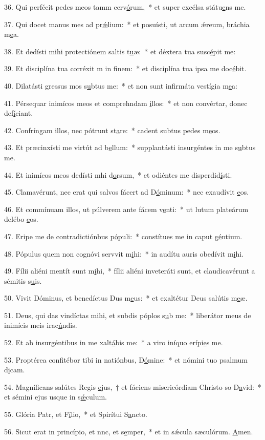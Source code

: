 36. Qui perfécit pedes meos tamm cerv\uline{ó}rum,~* et super excélsa státu\uline{e}ns me.\par 
37. Qui docet manus mes ad pr\uline{ǽ}lium:~* et posuísti, ut arcum ǽreum, bráchia m\uline{e}a.\par 
38. Et dedísti mihi protectiónem saltis t\uline{u}æ:~* et déxtera tua susc\uline{é}pit me:\par 
39. Et disciplína tua corréxit m in f\uline{i}nem:~* et disciplína tua ipsa me doc\uline{é}bit.\par 
40. Dilatásti gressus mos s\uline{u}btus me:~* et non sunt infirmáta vestígia m\uline{e}a:\par 
41. Pérsequar inimícos meos et comprehndam \uline{i}llos:~* et non convértar, donec def\uline{í}ciant.\par 
42. Confríngam illos, nec pótrunt st\uline{a}re:~* cadent subtus pedes m\uline{e}os.\par 
43. Et præcinxísti me virtút ad b\uline{e}llum:~* supplantásti insurgéntes in me s\uline{u}btus me.\par 
44. Et inimícos meos dedísti mhi d\uline{o}rsum,~* et odiéntes me disperdid\uline{í}sti.\par 
45. Clamavérunt, nec erat qui salvos fácert ad D\uline{ó}minum:~* nec exaudívit \uline{e}os.\par 
46. Et commínuam illos, ut púlverem ante fácem v\uline{e}nti:~* ut lutum plateárum delébo \uline{e}os.\par 
47. Eripe me de contradictiónbus p\uline{ó}puli:~* constítues me in caput g\uline{é}ntium.\par 
48. Pópulus quem non cognóvi servvit m\uline{i}hi:~* in audítu auris obedívit m\uline{i}hi.\par 
49. Fílii aliéni mentít sunt m\uline{i}hi,~* fílii aliéni inveteráti sunt, et claudicavérunt a sémitis s\uline{u}is.\par 
50. Vivit Dóminus, et benedíctus Dus m\uline{e}us:~* et exaltétur Deus salútis m\uline{e}æ.\par 
51. Deus, qui das vindíctas mihi, et subdis póplos s\uline{u}b me:~* liberátor meus de inimícis meis irac\uline{ú}ndis.\par 
52. Et ab insurgéntibus in me xalt\uline{á}bis me:~* a viro iníquo erípi\uline{e}s me.\par 
53. Proptérea confitébor tibi in natiónbus, D\uline{ó}mine:~* et nómini tuo psalmum d\uline{i}cam.\par 
54. Magníficans salútes Regis \uline{e}jus,~† et fáciens misericórdiam Christo so D\uline{a}vid:~* et sémini ejus usque in s\uline{ǽ}culum.\par 
55. Glória Patr, et F\uline{í}lio,~* et Spirítui S\uline{a}ncto.\par 
56. Sicut erat in princípio, et nnc, et s\uline{e}mper,~* et in sǽcula sæculórum. \uline{A}men.\par 
